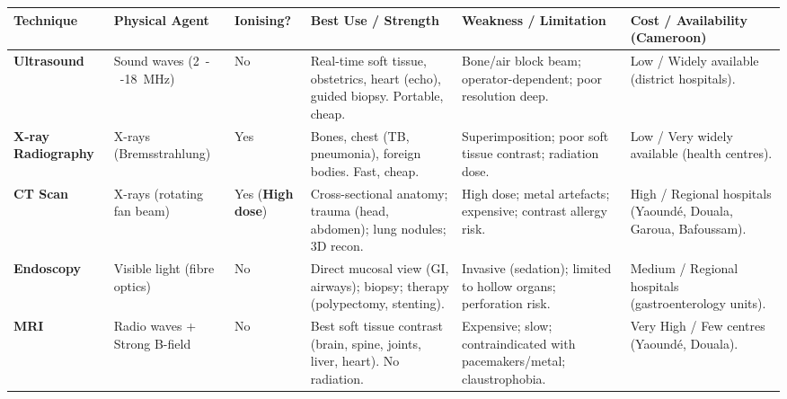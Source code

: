 \documentclass[11pt]{article}
\begin{document}
\begin{center}
\begin{tabularx}{\linewidth}{|l|X|X|X|X|X|}
\hline
\rowcolor{popblueL}
\textbf{Technique} & \textbf{Physical Agent} & \textbf{Ionising?} & \textbf{Best Use / Strength} & \textbf{Weakness / Limitation} & \textbf{Cost / Availability (Cameroon)} \\
\hline
\textbf{Ultrasound} & Sound waves (\SI{2}{--}\SI{18}{MHz}) & No & Real-time soft tissue, obstetrics, heart (echo), guided biopsy. Portable, cheap. & Bone/air block beam; operator-dependent; poor resolution deep. & Low / Widely available (district hospitals). \\
\hline
\textbf{X-ray Radiography} & X-rays (Bremsstrahlung) & Yes & Bones, chest (TB, pneumonia), foreign bodies. Fast, cheap. & Superimposition; poor soft tissue contrast; radiation dose. & Low / Very widely available (health centres). \\
\hline
\textbf{CT Scan} & X-rays (rotating fan beam) & Yes (\textbf{High dose}) & Cross-sectional anatomy; trauma (head, abdomen); lung nodules; 3D recon. & High dose; metal artefacts; expensive; contrast allergy risk. & High / Regional hospitals (Yaoundé, Douala, Garoua, Bafoussam). \\
\hline
\textbf{Endoscopy} & Visible light (fibre optics) & No & Direct mucosal view (GI, airways); biopsy; therapy (polypectomy, stenting). & Invasive (sedation); limited to hollow organs; perforation risk. & Medium / Regional hospitals (gastroenterology units). \\
\hline
\textbf{MRI} & Radio waves + Strong B-field & No & Best soft tissue contrast (brain, spine, joints, liver, heart). No radiation. & Expensive; slow; contraindicated with pacemakers/metal; claustrophobia. & Very High / Few centres (Yaoundé, Douala). \\
\hline
\end{tabularx}
\end{center}
\end{document}
